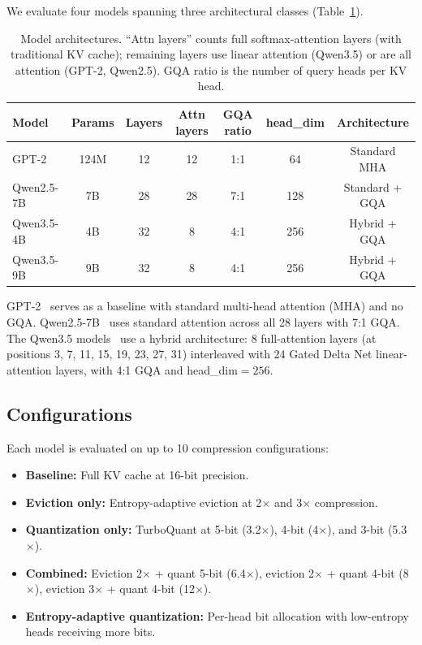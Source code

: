 \documentclass[11pt]{article}
\begin{document}
We evaluate four models spanning three architectural classes (Table~\ref{tab:models}).

\begin{table}[htbp]
\centering
\caption{Model architectures.  ``Attn layers'' counts full softmax-attention layers (with traditional KV cache); remaining layers use linear attention (Qwen3.5) or are all attention (GPT-2, Qwen2.5).  GQA ratio is the number of query heads per KV head.}
\label{tab:models}
\begin{tabular}{@{}lcccccc@{}}
\toprule
Model & Params & Layers & Attn layers & GQA ratio & head\_dim & Architecture \\
\midrule
GPT-2 & 124M & 12 & 12 & 1:1 & 64 & Standard MHA \\
Qwen2.5-7B & 7B & 28 & 28 & 7:1 & 128 & Standard + GQA \\
Qwen3.5-4B & 4B & 32 & 8 & 4:1 & 256 & Hybrid + GQA \\
Qwen3.5-9B & 9B & 32 & 8 & 4:1 & 256 & Hybrid + GQA \\
\bottomrule
\end{tabular}
\end{table}

GPT-2~\citep{radford2019language} serves as a baseline with standard multi-head attention (MHA) and no GQA.  Qwen2.5-7B~\citep{qwen2024qwen25} uses standard attention across all 28 layers with 7:1 GQA.  The Qwen3.5 models~\citep{qwen2025qwen3} use a hybrid architecture: 8 full-attention layers (at positions 3, 7, 11, 15, 19, 23, 27, 31) interleaved with 24 Gated Delta Net linear-attention layers, with 4:1 GQA and head\_dim${}=256$.

\subsection{Configurations}

Each model is evaluated on up to 10 compression configurations:
\begin{itemize}[leftmargin=*]
    \item \textbf{Baseline:} Full KV cache at 16-bit precision.
    \item \textbf{Eviction only:} Entropy-adaptive eviction at 2$\times$ and 3$\times$ compression.
    \item \textbf{Quantization only:} TurboQuant at 5-bit (3.2$\times$), 4-bit (4$\times$), and 3-bit (5.3$\times$).
    \item \textbf{Combined:} Eviction 2$\times$ + quant 5-bit (6.4$\times$), eviction 2$\times$ + quant 4-bit (8$\times$), eviction 3$\times$ + quant 4-bit (12$\times$).
    \item \textbf{Entropy-adaptive quantization:} Per-head bit allocation with low-entropy heads receiving more bits.
\end{itemize}
\end{document}
